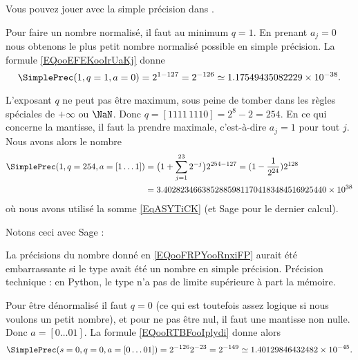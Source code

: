 Vous pouvez jouer avec la simple précision dans \cite{ooOSFYooHCgMRL}.

\begin{example}
    Pour faire un nombre normalisé, il faut au minimum \( q=1\). En prenant \( a_j=0\) nous obtenons le plus petit nombre normalisé possible en simple précision. La formule \eqref{EQooEFEKooIrUaKj} donne
    \begin{equation}
        \SimplePrec(1,q=1,a=0)=2^{1-127}=2^{-126}\simeq 1.17549435082229\times 10^{-38}.
    \end{equation}
\end{example}

\begin{example}
    L'exposant \( q\) ne peut pas être maximum, sous peine de tomber dans les règles spéciales de \( +\infty\) ou \( \NaN\). Donc \( q=[1111\,1110]=2^{8}-2=254\). En ce qui concerne la mantisse, il faut la prendre maximale, c'est-à-dire \( a_j=1\) pour tout \( j\). Nous avons alors le nombre
        \begin{subequations}
            \begin{align}
                \SimplePrec(1,q=254,a=[1\ldots 1])&=\big( 1+\sum_{j=1}^{23}2^{-j} \big)2^{254-127}=(1-\frac{1}{ 2^{24} })2^{128}\\
                &=3.40282346638528859811704183484516925440\times 10^{38}  \label{EQooFRPYooRnxiFP}
            \end{align}
        \end{subequations}
    où nous avons utilisé la somme \eqref{EqASYTiCK} (et Sage pour le dernier calcul).
\end{example}

Notons ceci avec Sage :


La précisions du nombre donné en \eqref{EQooFRPYooRnxiFP} aurait été embarrassante si le type avait été un nombre en simple précision. Précision technique : en Python, le type  n'a pas de limite supérieure à part la mémoire.

\begin{example}
    Pour être dénormalisé il faut \( q=0\) (ce qui est toutefois assez logique si nous voulons un petit nombre), et pour ne pas être nul, il faut une mantisse non nulle. Donc \( a=[0\ldots 01]\). La formule \eqref{EQooRTBFooIplydi} donne alors
    \begin{equation}
        \SimplePrec(s=0,q=0,a=[0\ldots 01])=2^{-126}2^{-23}=2^{-149}\simeq 1.40129846432482\times 10^{-45}.
    \end{equation}
\end{example}

